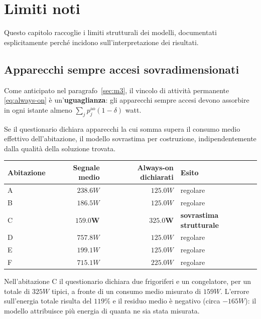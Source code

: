 \chapter{Limiti noti}
\label{ch:limiti}

Questo capitolo raccoglie i limiti strutturali dei modelli, documentati esplicitamente perché
incidono sull'interpretazione dei risultati.

\section{Apparecchi sempre accesi sovradimensionati}

Come anticipato nel paragrafo~\ref{sec:m3}, il vincolo di attività permanente
\eqref{eq:always-on} è un'\textbf{uguaglianza}: gli apparecchi sempre accesi devono assorbire in
ogni istante almeno $\sum_j p^{\text{ao}}_j (1-\delta)$ watt.

Se il questionario dichiara apparecchi la cui somma supera il consumo medio effettivo
dell'abitazione, il modello sovrastima per costruzione, indipendentemente dalla qualità della
soluzione trovata.

\begin{center}
\begin{tabular}{@{}l r r l@{}}
\toprule
\textbf{Abitazione} & \textbf{Segnale medio} & \textbf{Always-on dichiarati} & \textbf{Esito} \\
\midrule
A & $238.6\unit{W}$ & $125.0\unit{W}$ & regolare \\
B & $186.5\unit{W}$ & $125.0\unit{W}$ & regolare \\
C & $\mathbf{159.0}\unit{\mathbf{W}}$ & $\mathbf{325.0}\unit{\mathbf{W}}$ & \textbf{sovrastima strutturale} \\
D & $757.8\unit{W}$ & $125.0\unit{W}$ & regolare \\
E & $199.1\unit{W}$ & $125.0\unit{W}$ & regolare \\
F & $715.1\unit{W}$ & $225.0\unit{W}$ & regolare \\
\bottomrule
\end{tabular}
\end{center}

Nell'abitazione C il questionario dichiara due frigoriferi e un congelatore, per un totale di
$325\unit{W}$ tipici, a fronte di un consumo medio misurato di $159\unit{W}$. L'errore
sull'energia totale risulta del $119\%$ e il residuo medio è negativo (circa
$-165\unit{W}$): il modello attribuisce più energia di quanta ne sia stata misurata.

